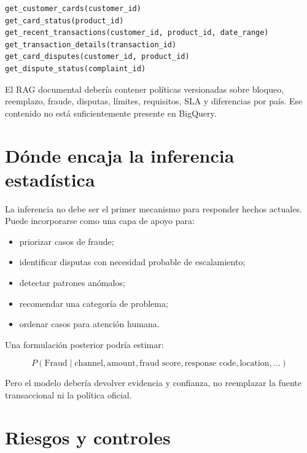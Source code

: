 \documentclass[11pt,a4paper]{article}
\begin{document}
\begin{lstlisting}
get_customer_cards(customer_id)
get_card_status(product_id)
get_recent_transactions(customer_id, product_id, date_range)
get_transaction_details(transaction_id)
get_card_disputes(customer_id, product_id)
get_dispute_status(complaint_id)
\end{lstlisting}

El RAG documental debería contener políticas versionadas sobre bloqueo, reemplazo, fraude, disputas, límites, requisitos, SLA y diferencias por país. Ese contenido no está suficientemente presente en BigQuery.

\section{Dónde encaja la inferencia estadística}

La inferencia no debe ser el primer mecanismo para responder hechos actuales. Puede incorporarse como una capa de apoyo para:

\begin{itemize}
  \item priorizar casos de fraude;
  \item identificar disputas con necesidad probable de escalamiento;
  \item detectar patrones anómalos;
  \item recomendar una categoría de problema;
  \item ordenar casos para atención humana.
\end{itemize}

Una formulación posterior podría estimar:

\[
P(\text{Fraud}\mid\text{channel},\text{amount},\text{fraud score},\text{response code},\text{location},\ldots)
\]

Pero el modelo debería devolver evidencia y confianza, no reemplazar la fuente transaccional ni la política oficial.

\section{Riesgos y controles}
\end{document}
